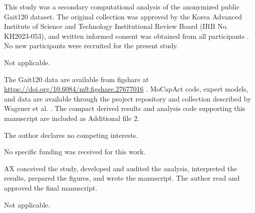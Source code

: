 \documentclass[referee,lineno,pdflatex,sn-vancouver-num]{sn-jnl}
\begin{document}
This study was a secondary computational analysis of the anonymized public Gait120 dataset. The original collection was approved by the Korea Advanced Institute of Science and Technology Institutional Review Board (IRB No. KH2023-053), and written informed consent was obtained from all participants \cite{boo2025}. No new participants were recruited for the present study.

Not applicable.

The Gait120 data are available from figshare at \url{https://doi.org/10.6084/m9.figshare.27677016} \cite{boo2025dataset}. MoCapAct code, expert models, and data are available through the project repository and collection described by Wagener et al. \cite{wagener2022}. The compact derived results and analysis code supporting this manuscript are included as Additional file 2.

The author declares no competing interests.

No specific funding was received for this work.

AX conceived the study, developed and audited the analysis, interpreted the results, prepared the figures, and wrote the manuscript. The author read and approved the final manuscript.

Not applicable.


\end{document}
